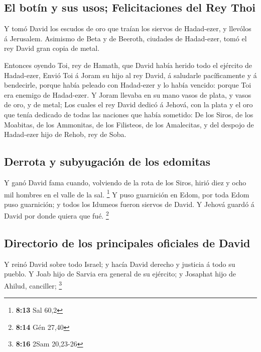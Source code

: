 \hypertarget{el-botuxedn-y-sus-usos-felicitaciones-del-rey-thoi}{%
\subsection{El botín y sus usos; Felicitaciones del Rey
Thoi}\label{el-botuxedn-y-sus-usos-felicitaciones-del-rey-thoi}}

 Y tomó David los escudos de oro que traían los siervos de
Hadad-ezer, y llevólos á Jerusalem.  Asimismo de Beta y de
Beeroth, ciudades de Hadad-ezer, tomó el rey David gran copia de metal.

 Entonces oyendo Toi, rey de Hamath, que David había herido
todo el ejército de Hadad-ezer,  Envió Toi á Joram su hijo
al rey David, á saludarle pacíficamente y á bendecirle, porque había
peleado con Hadad-ezer y lo había vencido: porque Toi era enemigo de
Hadad-ezer. Y Joram llevaba en su mano vasos de plata, y vasos de oro, y
de metal;  Los cuales el rey David dedicó á Jehová, con la
plata y el oro que tenía dedicado de todas las naciones que había
sometido:  De los Siros, de los Moabitas, de los Ammonitas,
de los Filisteos, de los Amalecitas, y del despojo de Hadad-ezer hijo de
Rehob, rey de Soba.

\hypertarget{derrota-y-subyugaciuxf3n-de-los-edomitas}{%
\subsection{Derrota y subyugación de los
edomitas}\label{derrota-y-subyugaciuxf3n-de-los-edomitas}}

 Y ganó David fama cuando, volviendo de la rota de los
Siros, hirió diez y ocho mil hombres en el valle de la sal. \footnote{\textbf{8:13}
  Sal 60,2}  Y puso guarnición en Edom, por toda Edom puso
guarnición; y todos los Idumeos fueron siervos de David. Y Jehová guardó
á David por donde quiera que fué. \footnote{\textbf{8:14} Gén 27,40}

\hypertarget{directorio-de-los-principales-oficiales-de-david}{%
\subsection{Directorio de los principales oficiales de
David}\label{directorio-de-los-principales-oficiales-de-david}}

 Y reinó David sobre todo Israel; y hacía David derecho y
justicia á todo su pueblo.  Y Joab hijo de Sarvia era
general de su ejército; y Josaphat hijo de Ahilud, canciller;
\footnote{\textbf{8:16} 2Sam 20,23-26}

